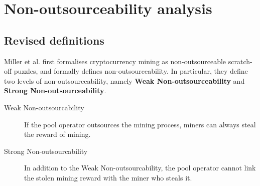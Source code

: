 \section{Non-outsourceability analysis}



\subsection{Revised definitions}

Miller et al. \cite{miller2015nonoutsourceable} first formalises cryptocurrency mining as non-outsourceable scratch-off puzzles, and formally defines non-outsourceability.
In particular, they define two levels of non-outsourceability, namely \textbf{Weak Non-outsourceability} and \textbf{Strong Non-outsourceability}.

\begin{description}
    \item[Weak Non-outsourcability] If the pool operator outsources the mining process, miners can always steal the reward of mining.
    \item[Strong Non-outsourcability] In addition to the Weak Non-outsourcability, the pool operator cannot link the stolen mining reward with the miner who steals it.
\end{description}

